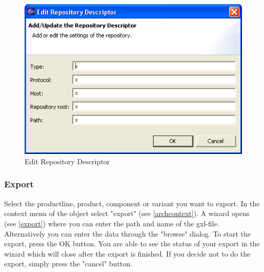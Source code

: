 \begin{figure}[h!]
\begin{center}
\includegraphics[width=12cm]{repository.png}
   \caption{Edit Repository Descriptor}
\label{repository}
\end{center}
\end{figure}\par



\subsubsection{Export}

Select the productline, product, component or variant you want to export. In the
context menu of the object select "export" (see \ref{archcontext}). A wizard opens (see \ref{export}) where you can enter
the path and name of the gxl-file. Alternatively you can enter 
the data through the "browse" dialog. To start the export, press the OK button.
You are able to see the status of your export in the wizard which will close after
the export is finished. If you decide not to do the export, simply press the 
"cancel" button.

